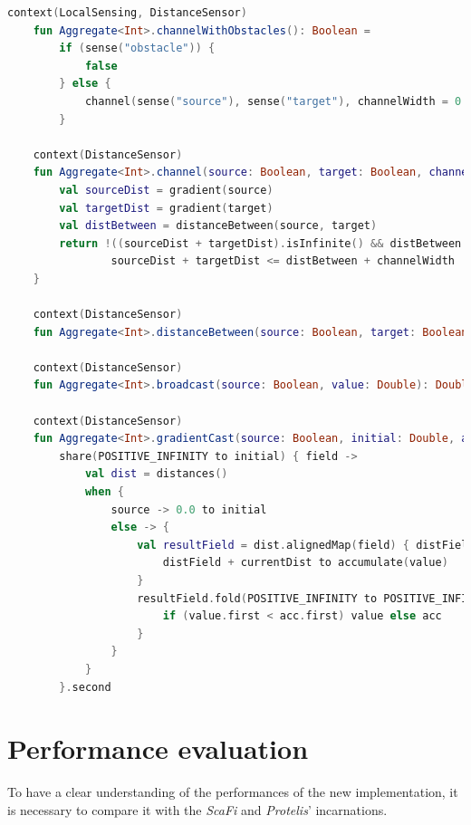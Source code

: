 \begin{minipage}{\linewidth}
    \begin{lstlisting}[language=kt, caption={Channel with Obstacles code example}, label={lst:channel-with-obstacles-example}]
    context(LocalSensing, DistanceSensor)
    fun Aggregate<Int>.channelWithObstacles(): Boolean =
        if (sense("obstacle")) {
            false
        } else {
            channel(sense("source"), sense("target"), channelWidth = 0.5)
        }

    context(DistanceSensor)
    fun Aggregate<Int>.channel(source: Boolean, target: Boolean, channelWidth: Double): Boolean {
        val sourceDist = gradient(source)
        val targetDist = gradient(target)
        val distBetween = distanceBetween(source, target)
        return !((sourceDist + targetDist).isInfinite() && distBetween.isInfinite()) &&
                sourceDist + targetDist <= distBetween + channelWidth
    }

    context(DistanceSensor)
    fun Aggregate<Int>.distanceBetween(source: Boolean, target: Boolean): Double = broadcast(source, gradient(target))

    context(DistanceSensor)
    fun Aggregate<Int>.broadcast(source: Boolean, value: Double): Double = gradientCast(source, value) { it }

    context(DistanceSensor)
    fun Aggregate<Int>.gradientCast(source: Boolean, initial: Double, accumulate: (Double) -> Double): Double =
        share(POSITIVE_INFINITY to initial) { field ->
            val dist = distances()
            when {
                source -> 0.0 to initial
                else -> {
                    val resultField = dist.alignedMap(field) { distField, (currentDist, value) ->
                        distField + currentDist to accumulate(value)
                    }
                    resultField.fold(POSITIVE_INFINITY to POSITIVE_INFINITY) { acc, value ->
                        if (value.first < acc.first) value else acc
                    }
                }
            }
        }.second
    \end{lstlisting}
\end{minipage}

\section{Performance evaluation}
\label{sec:performance-evaluation}
To have a clear understanding of the performances of the new implementation, it is necessary to compare it with the
\emph{ScaFi} and \emph{Protelis}' incarnations.

